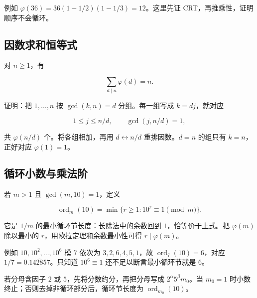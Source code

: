 例如 $\varphi(36)=36(1-1/2)(1-1/3)=12$。这里先证 CRT，再推乘性，证明顺序不会循环。

\subsection{因数求和恒等式}


对 $n\ge1$，有

\[
\sum_{d\mid n}\varphi(d)=n.
\]

证明：把 $1,\ldots,n$ 按 $\gcd(k,n)=d$ 分组。每一组写成 $k=dj$，就对应

\[
1\le j\le n/d,\qquad\gcd(j,n/d)=1,
\]

共 $\varphi(n/d)$ 个。将各组相加，再用 $d\leftrightarrow n/d$ 重排因数。$d=n$ 的组只有 $k=n$，正好对应 $\varphi(1)=1$。

\subsection{循环小数与乘法阶}


若 $m>1$ 且 $\gcd(m,10)=1$，定义

\[
\operatorname{ord}_m(10)=\min\{r\ge1:10^r\equiv1\pmod m\}.
\]

它是 $1/m$ 的最小循环节长度：长除法中的余数回到 $1$，恰等价于上式。把 $\varphi(m)$ 除以最小的 $r$，用欧拉定理和余数最小性可得 $r\mid\varphi(m)$。

例如 $10,10^2,\ldots,10^6$ 模 $7$ 依次为 $3,2,6,4,5,1$，故 $\operatorname{ord}_7(10)=6$，对应 $1/7=0.\overline{142857}$。只知道 $10^6\equiv1$ 还不足以断言最小循环节就是 $6$。

若分母含因子 $2$ 或 $5$，先将分数约分，再把分母写成 $2^\alpha5^\beta m_0$。当 $m_0=1$ 时小数终止；否则去掉非循环部分后，循环节长度为 $\operatorname{ord}_{m_0}(10)$。
